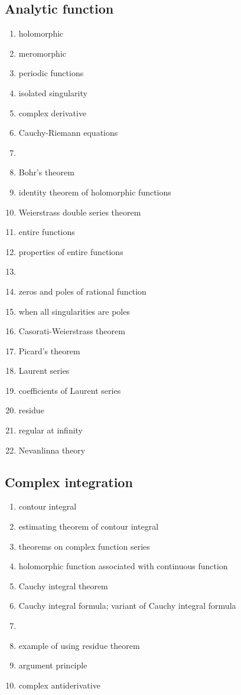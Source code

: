 \documentclass[12pt]{article}
\theoremstyle{definition}
\begin{document}
\subsection{Analytic function}
\begin{enumerate}
\item holomorphic
\item meromorphic
\item periodic functions
\item isolated singularity
\item complex derivative
\item Cauchy-Riemann equations
\item {}
\item Bohr's theorem
\item identity theorem of holomorphic functions
\item Weierstrass double series theorem
\item entire functions
\item properties of entire functions
\item {}
\item zeros and poles of rational function
\item when all singularities are poles
\item Casorati-Weierstrass theorem
\item Picard's theorem
\item Laurent series
\item coefficients of Laurent series
\item residue
\item regular at infinity
\item Nevanlinna theory
\end{enumerate}

\subsection{Complex integration}
\begin{enumerate}
\item contour integral
\item estimating theorem of contour integral 
\item theorems on complex function series
\item holomorphic function associated with continuous function
\item Cauchy integral theorem
\item Cauchy integral formula; variant of Cauchy integral formula
\item {}
\item example of using residue theorem
\item argument principle
\item complex antiderivative
\end{enumerate}
\end{document}
